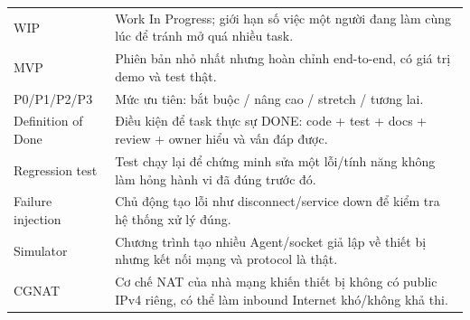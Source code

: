 \begin{longtable}{p{3.4cm} p{11.2cm}}
WIP & Work In Progress; giới hạn số việc một người đang làm cùng lúc để tránh mở quá nhiều task. \\
MVP & Phiên bản nhỏ nhất nhưng hoàn chỉnh end-to-end, có giá trị demo và test thật. \\
P0/P1/P2/P3 & Mức ưu tiên: bắt buộc / nâng cao / stretch / tương lai. \\
Definition of Done & Điều kiện để task thực sự DONE: code + test + docs + review + owner hiểu và vấn đáp được. \\
Regression test & Test chạy lại để chứng minh sửa một lỗi/tính năng không làm hỏng hành vi đã đúng trước đó. \\
Failure injection & Chủ động tạo lỗi như disconnect/service down để kiểm tra hệ thống xử lý đúng. \\
Simulator & Chương trình tạo nhiều Agent/socket giả lập về thiết bị nhưng kết nối mạng và protocol là thật. \\
CGNAT & Cơ chế NAT của nhà mạng khiến thiết bị không có public IPv4 riêng, có thể làm inbound Internet khó/không khả thi. \\
\bottomrule
\end{longtable}
